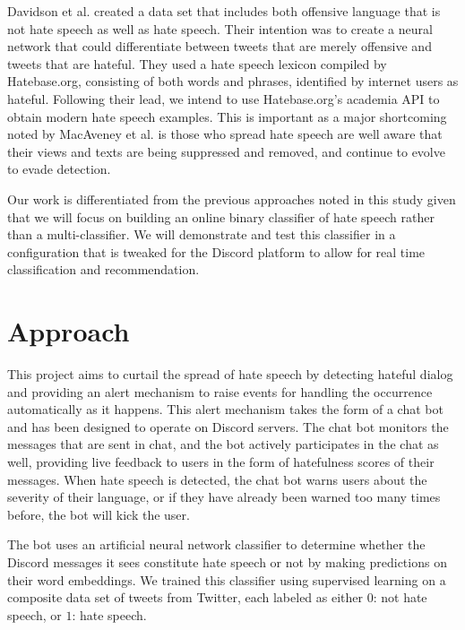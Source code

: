 \documentclass[conference]{sig-alternate-05-2015}
\begin{document}
Davidson et al. created a data set that includes both offensive language that is not hate speech as well as hate speech. Their intention was to create a neural network that could differentiate between tweets that are merely offensive and tweets that are hateful. They used a hate speech lexicon compiled by Hatebase.org, consisting of both words and phrases, identified by internet users as hateful.  Following their lead, we intend to use Hatebase.org's academia API to obtain modern hate speech examples.  This is important as a major shortcoming noted by MacAveney et al.\cite{MacAvaneyetal.} is those who spread hate speech are well aware that their views and texts are being suppressed and removed, and continue to evolve to evade detection.

Our work is differentiated from the previous approaches noted in this study given that we will focus on building an online binary classifier of hate speech rather than a multi-classifier.  We will demonstrate and test this classifier in a configuration that is tweaked for the Discord platform to allow for real time classification and recommendation.

\section{Approach}\label{sec:approach}
This project aims to curtail the spread of hate speech by detecting hateful dialog and providing an alert mechanism to raise events for handling the occurrence automatically as it happens. This alert mechanism takes the form of a chat bot and has been designed to operate on Discord servers. The chat bot monitors the messages that are sent in chat, and the bot actively participates in the chat as well, providing live feedback to users in the form of hatefulness scores of their messages. When hate speech is detected, the chat bot warns users about the severity of their language, or if they have already been warned too many times before, the bot will kick the user.

The bot uses an artificial neural network classifier to determine whether the Discord messages it sees constitute hate speech or not by making predictions on their word embeddings. We trained this classifier using supervised learning on a composite data set of tweets from Twitter, each labeled as either $0$: not hate speech, or $1$: hate speech.
\end{document}
